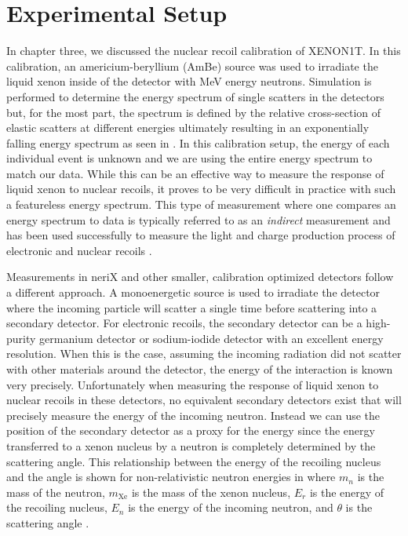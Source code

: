 \section{Experimental Setup}
\label{sec:nerix_expt_setup}

In chapter three, we discussed the nuclear recoil calibration of XENON1T.  In this calibration, an americium-beryllium (AmBe) source was used to irradiate the liquid xenon inside of the detector with MeV energy neutrons.  Simulation is performed to determine the energy spectrum of single scatters in the detectors but, for the most part, the spectrum is defined by the relative cross-section of elastic scatters at different energies ultimately resulting in an exponentially falling energy spectrum as seen in .  In this calibration setup, the energy of each individual event is unknown and we are using the entire energy spectrum to match our data.  While this can be an effective way to measure the response of liquid xenon to nuclear recoils, it proves to be very difficult in practice with such a featureless energy spectrum.  This type of measurement where one compares an energy spectrum to data is typically referred to as an \textit{indirect} measurement and has been used successfully to measure the light and charge production process of electronic and nuclear recoils \cite{aprile2013response, akerib2016tritium, aprile2017tritium}.

Measurements in neriX and other smaller, calibration optimized detectors follow a different approach.  A monoenergetic source is used to irradiate the detector where the incoming particle will scatter a single time before scattering into a secondary detector.  For electronic recoils, the secondary detector can be a high-purity germanium detector or sodium-iodide detector with an excellent energy resolution.  When this is the case, assuming the incoming radiation did not scatter with other materials around the detector, the energy of the interaction is known very precisely.  Unfortunately when measuring the response of liquid xenon to nuclear recoils in these detectors, no equivalent secondary detectors exist that will precisely measure the energy of the incoming neutron.  Instead we can use the position of the secondary detector as a proxy for the energy since the energy transferred to a xenon nucleus by a neutron is completely determined by the scattering angle.  This relationship between the energy of the recoiling nucleus and the angle is shown for non-relativistic neutron energies in  where $m_n$ is the mass of the neutron, $m_{\textrm{Xe}}$ is the mass of the xenon nucleus, $E_r$ is the energy of the recoiling nucleus, $E_n$ is the energy of the incoming neutron, and $\theta$ is the scattering angle \cite{knoll2010radiation}.

